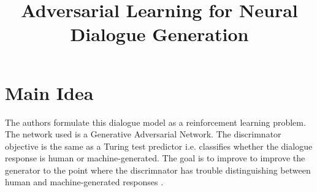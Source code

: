 \documentclass[12pt]{scrartcl}
\begin{document}
\title{Adversarial Learning for Neural Dialogue Generation}
\author{}
\date{}
\maketitle

\section{Main Idea}
  The authors formulate this dialogue model as a reinforcement learning problem. The network used is a Generative Adversarial Network. The discrimnator objective is the same as a Turing test predictor i.e. classifies whether the dialogue response is human or machine-generated. The goal is to improve to improve the generator to the point where the discrimnator has trouble distinguishing between human and machine-generated responses \cite{li2017adversarial}.
\end{document}

